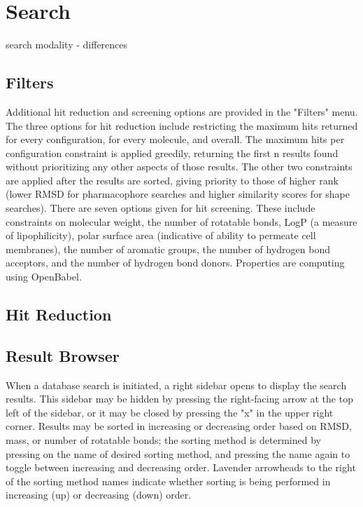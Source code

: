 \section{Search}

search modality - differences

\subsection{Filters}
Additional hit reduction and screening options are provided in the "Filters" menu. The three options for hit reduction include restricting the maximum hits returned for every configuration, for every molecule, and overall. The maximum hits per configuration constraint is applied greedily, returning the first n results found without prioritizing any other aspects of those results. The other two constraints are applied after the results are sorted, giving priority to those of higher rank (lower RMSD for pharmacophore searches and higher similarity scores for shape searches). There are seven options given for hit screening. These include constraints on molecular weight, the number of rotatable bonds, LogP (a measure of lipophilicity), polar surface area (indicative of ability to permeate cell membranes), the number of aromatic groups, the number of hydrogen bond acceptors, and the number of hydrogen bond donors. Properties are computing using OpenBabel. 

\subsection{Hit Reduction}

\subsection{Result Browser}
When a database search is initiated, a right sidebar opens to display the search results. This sidebar may be hidden by pressing the right-facing arrow at the top left of the sidebar, or it may be closed by pressing the "x" in the upper right corner. Results may be sorted in increasing or decreasing order based on RMSD, mass, or number of rotatable bonds; the sorting method is determined by pressing on the name of desired sorting method, and pressing the name again to toggle between increasing and decreasing order. Lavender arrowheads to the right of the sorting method names indicate whether sorting is being performed in increasing (up) or decreasing (down) order. 